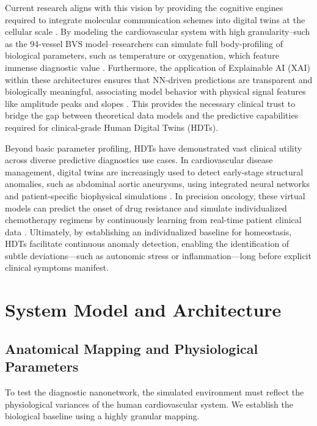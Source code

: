 \documentclass[sigconf]{acmart}
\begin{document}
Current research aligns with this vision by providing the cognitive engines required to integrate molecular communication schemes into digital twins at the cellular scale \cite{torres2025communicating}. By modeling the cardiovascular system with high granularity--such as the 94-vessel BVS model--researchers can simulate full body-profiling of biological parameters, such as temperature or oxygenation, which feature immense diagnostic value \cite{lopez2023toward}. Furthermore, the application of Explainable AI (XAI) within these architectures ensures that NN-driven predictions are transparent and biologically meaningful, associating model behavior with physical signal features like amplitude peaks and slopes \cite{bartra2024graph}. This provides the necessary clinical trust to bridge the gap between theoretical data models and the predictive capabilities required for clinical-grade Human Digital Twins (HDTs).

Beyond basic parameter profiling, HDTs have demonstrated vast clinical utility across diverse predictive diagnostics use cases. In cardiovascular disease management, digital twins are increasingly used to detect early-stage structural anomalies, such as abdominal aortic aneurysms, using integrated neural networks and patient-specific biophysical simulations \cite{zhang2024concepts}. In precision oncology, these virtual models can predict the onset of drug resistance and simulate individualized chemotherapy regimens by continuously learning from real-time patient clinical data \cite{zhang2024concepts}. Ultimately, by establishing an individualized baseline for homeostasis, HDTs facilitate continuous anomaly detection, enabling the identification of subtle deviations—such as autonomic stress or inflammation—long before explicit clinical symptoms manifest.

\section{System Model and Architecture}

\subsection{Anatomical Mapping and Physiological Parameters}

To test the diagnostic nanonetwork, the simulated environment must reflect the physiological variances of the human cardiovascular system. We establish the biological baseline using a highly granular mapping.
\end{document}
